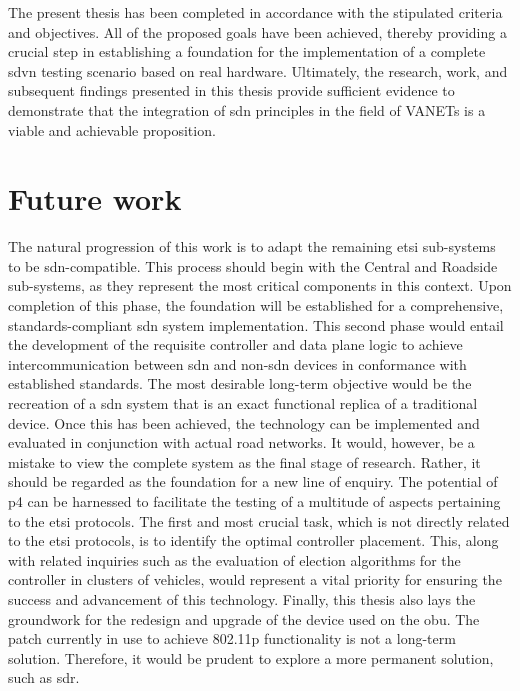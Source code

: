 The present thesis has been completed in accordance with the stipulated criteria and objectives. All of the proposed goals have been achieved, thereby providing a crucial step in establishing a foundation for the implementation of a complete \gls{sdvn} testing scenario based on real hardware. Ultimately, the research, work, and subsequent findings presented in this thesis provide sufficient evidence to demonstrate that the integration of \gls{sdn} principles in the field of VANETs is a viable and achievable proposition.

\section{Future work}
The natural progression of this work is to adapt the remaining \gls{etsi} sub-systems to be \gls{sdn}-compatible. This process should begin with the Central and Roadside sub-systems, as they represent the most critical components in this context. 
Upon completion of this phase, the foundation will be established for a comprehensive, standards-compliant \gls{sdn} system implementation. This second phase would entail the development of the requisite controller and data plane logic to achieve intercommunication between \gls{sdn} and non-\gls{sdn} devices in conformance with established standards.
The most desirable long-term objective would be the recreation of a \gls{sdn} system that is an exact functional replica of a traditional device. Once this has been achieved, the technology can be implemented and evaluated in conjunction with actual road networks.
It would, however, be a mistake to view the complete system as the final stage of research. Rather, it should be regarded as the foundation for a new line of enquiry. The potential of \gls{p4} can be harnessed to facilitate the testing of a multitude of aspects pertaining to the \gls{etsi} protocols. The first and most crucial task, which is not directly related to the \gls{etsi} protocols, is to identify the optimal controller placement. This, along with related inquiries such as the evaluation of election algorithms for the controller in clusters of vehicles, would represent a vital priority for ensuring the success and advancement of this technology.
Finally, this thesis also lays the groundwork for the redesign and upgrade of the device used on the \gls{obu}. The patch currently in use to achieve 802.11p functionality is not a long-term solution. Therefore, it would be prudent to explore a more permanent solution, such as \gls{sdr}.
